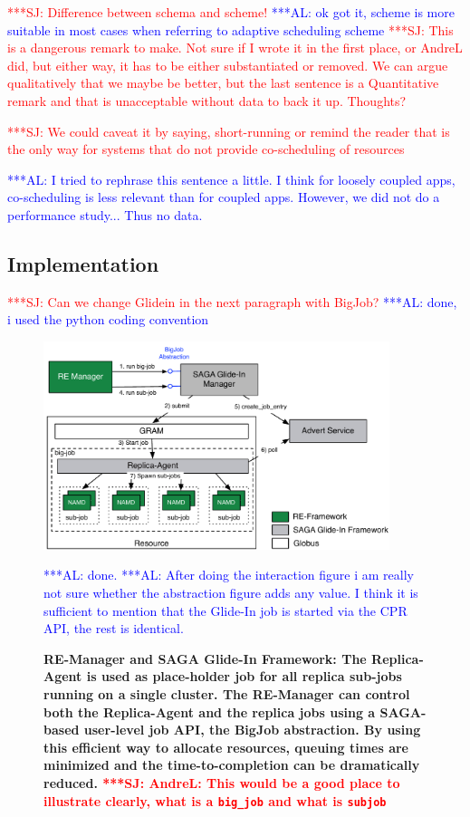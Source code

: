 \documentclass{rspublic}
\newcommand{\alnote}[1]{ {\textcolor{blue} { ***AL: #1 }}}
\newcommand{\jhanote}[1]{ {\textcolor{red} { ***SJ: #1 }}}
\newcommand{\alnote}[1]{}
\newcommand{\jhanote}[1]{}
\newcommand{\replicaagent}[1]{Replica-Agent }
\newcommand{\remanager}[1]{RE-Manager }
\begin{document}
\jhanote{Difference between schema and scheme!}
\alnote{ok got it, scheme is more suitable in most cases when referring to adaptive
scheduling scheme}
\jhanote{This is a dangerous remark to
  make. Not sure if I wrote it in the first place, or AndreL did, but
  either way, it has to be either substantiated or removed. We can
  argue qualitatively that we maybe be better, but the last sentence
  is a Quantitative remark and that is unacceptable without data to
  back it up. Thoughts?}

\jhanote{We could caveat it by saying, short-running or remind the
  reader that is the only way for systems that do not provide
  co-scheduling of resources}

\alnote{I tried to rephrase this sentence a little. I think for loosely coupled
apps, co-scheduling is less relevant than for coupled apps. However,
we did not do a performance study... Thus no data.}   
         
\subsection{Implementation}
\jhanote{Can we change Glidein in the next paragraph with BigJob?}
\alnote{done, i used the python coding convention}    

\begin{figure}[t]
    \centering
    \includegraphics[width=0.9\textwidth]{re_bigjob_interactions}   
    
    \caption{\footnotesize \bf RE-Manager and SAGA Glide-In Framework:  
      The Replica-Agent is used as    place-holder job for all 
      replica sub-jobs running on a single
      cluster. The \remanager\ can control both the \replicaagent\ and
      the replica jobs using a SAGA-based user-level job API, the BigJob 
      abstraction. By using this efficient way to allocate resources, 
      queuing times are minimized and the time-to-completion can be dramatically
      reduced. \jhanote{AndreL: This would be a good place to
        illustrate clearly, what is a \texttt{big\_job} and 
        what is \texttt{sub\-job}}} \alnote{done.} \alnote{After doing the interaction
        figure i am really not sure whether the abstraction figure adds any value. I think
        it is sufficient to mention that the Glide-In job is started via the CPR API, the
        rest is identical.}
    \label{fig:remdmanager_v1.1}
\end{figure}
\end{document}
